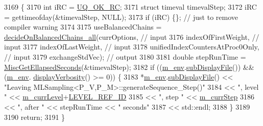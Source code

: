 \begin{DoxyCode}
3169 \{
3170   \textcolor{keywordtype}{int} iRC = \hyperlink{namespace_q_u_e_s_o_a8e909502900aecf24cedba022ea84471}{UQ\_OK\_RC};
3171   \textcolor{keyword}{struct }timeval timevalStep;
3172   iRC = gettimeofday(&timevalStep, NULL);
3173   \textcolor{keywordflow}{if} (iRC) \{\}; \textcolor{comment}{// just to remove compiler warning}
3174 
3175   useBalancedChains = \hyperlink{class_q_u_e_s_o_1_1_m_l_sampling_a0f6f7872635b9546b3215fee347601f6}{decideOnBalancedChains\_all}(currOptions,                    
       \textcolor{comment}{// input}
3176                                                  indexOfFirstWeight,              \textcolor{comment}{// input}
3177                                                  indexOfLastWeight,               \textcolor{comment}{// input}
3178                                                  unifiedIndexCountersAtProc0Only, \textcolor{comment}{// input}
3179                                                  exchangeStdVec);                 \textcolor{comment}{// output}
3180 
3181   \textcolor{keywordtype}{double} stepRunTime = \hyperlink{namespace_q_u_e_s_o_a424bc33f2e6e287fd468408d14b772ee}{MiscGetEllapsedSeconds}(&timevalStep);
3182   \textcolor{keywordflow}{if} ((\hyperlink{class_q_u_e_s_o_1_1_m_l_sampling_a13f1ca4fe9f94822fe572a743eaced1d}{m\_env}.\hyperlink{class_q_u_e_s_o_1_1_base_environment_a8a0064746ae8dddfece4229b9ad374d6}{subDisplayFile}()) && (\hyperlink{class_q_u_e_s_o_1_1_m_l_sampling_a13f1ca4fe9f94822fe572a743eaced1d}{m\_env}.
      \hyperlink{class_q_u_e_s_o_1_1_base_environment_a1fe5f244fc0316a0ab3e37463f108b96}{displayVerbosity}() >= 0)) \{
3183     *\hyperlink{class_q_u_e_s_o_1_1_m_l_sampling_a13f1ca4fe9f94822fe572a743eaced1d}{m\_env}.\hyperlink{class_q_u_e_s_o_1_1_base_environment_a8a0064746ae8dddfece4229b9ad374d6}{subDisplayFile}() << \textcolor{stringliteral}{"Leaving MLSampling<P\_V,P\_M>::generateSequence\_Step()"}
3184                             << \textcolor{stringliteral}{", level "} << \hyperlink{class_q_u_e_s_o_1_1_m_l_sampling_af9416874c856e50f3b35270e801f17e4}{m\_currLevel}+\hyperlink{_m_l_sampling_level_options_8h_a68d15eaf394d210effcf584b938206d3}{LEVEL\_REF\_ID}
3185                             << \textcolor{stringliteral}{", step "}  << \hyperlink{class_q_u_e_s_o_1_1_m_l_sampling_a1b1f8ccb4823bdfa26ec652f0807c63e}{m\_currStep}
3186                             << \textcolor{stringliteral}{", after "} << stepRunTime << \textcolor{stringliteral}{" seconds"}
3187                             << std::endl;
3188   \}
3189 
3190   \textcolor{keywordflow}{return};
3191 \}
\end{DoxyCode}

